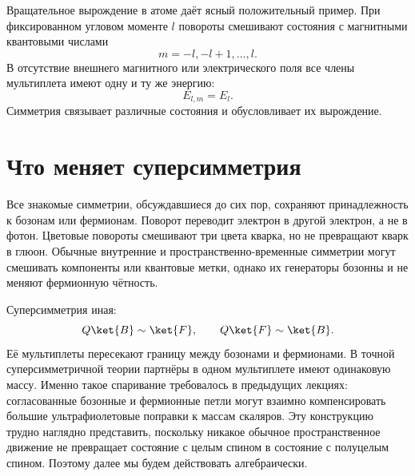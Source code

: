 \begin{classroomqa}
\end{classroomqa}

Вращательное вырождение в атоме даёт ясный положительный пример. При фиксированном угловом моменте \(l\) повороты смешивают состояния с магнитными квантовыми числами
\begin{equation}
m=-l,-l+1,\ldots,l.
\end{equation}
В отсутствие внешнего магнитного или электрического поля все члены мультиплета имеют одну и ту же энергию:
\begin{equation}
E_{l,m}=E_l.
\end{equation}
Симметрия связывает различные состояния и обусловливает их вырождение.

\section{Что меняет суперсимметрия}

Все знакомые симметрии, обсуждавшиеся до сих пор, сохраняют принадлежность к бозонам или фермионам. Поворот переводит электрон в другой электрон, а не в фотон. Цветовые повороты смешивают три цвета кварка, но не превращают кварк в глюон. Обычные внутренние и пространственно-временные симметрии могут смешивать компоненты или квантовые метки, однако их генераторы бозонны и не меняют фермионную чётность.

Суперсимметрия иная:
\begin{equation}
Q\ket{B}\sim\ket{F},
\qquad
Q\ket{F}\sim\ket{B}.
\end{equation}
Её мультиплеты пересекают границу между бозонами и фермионами. В точной суперсимметричной теории партнёры в одном мультиплете имеют одинаковую массу. Именно такое спаривание требовалось в предыдущих лекциях: согласованные бозонные и фермионные петли могут взаимно компенсировать большие ультрафиолетовые поправки к массам скаляров. Эту конструкцию трудно наглядно представить, поскольку никакое обычное пространственное движение не превращает состояние с целым спином в состояние с полуцелым спином. Поэтому далее мы будем действовать алгебраически.

